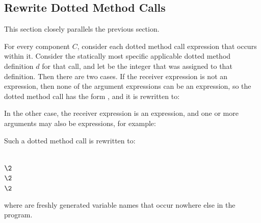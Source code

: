 \subsection{Rewrite Dotted Method Calls}

This section closely parallels the previous section.

For every component $C$, consider each dotted method call expression
that occurs within it.  Consider the statically most specific applicable dotted method
definition $d$ for that call, and let  be the integer that was assigned to that definition.
Then there are two cases.  If the receiver expression is not an  expression, then none of the
argument expressions can be an  expression, so the dotted method call
has the form , and it is rewritten to:
\begin{codeexamplesize}
\begin{tabbing}
\end{tabbing}
\end{codeexamplesize}
In the other case, the receiver expression is an  expression,
and one or more arguments may also be  expressions, for example:
\begin{codeexamplesize}
\begin{tabbing}
\end{tabbing}
\end{codeexamplesize}
Such a dotted method call is rewritten to:
\begin{codeexamplesize}
\begin{tabbing}
 \\
\(\2\) \\
\(\2\)\= \\
\(\2\)\> \\
\end{tabbing}
\end{codeexamplesize}
where  are freshly generated variable names
that occur nowhere else in the program.


